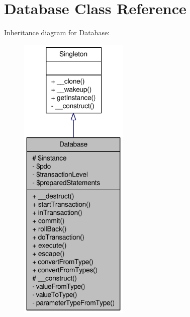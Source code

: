 \hypertarget{classDatabase}{
\section{Database Class Reference}
\label{classDatabase}
}


Inheritance diagram for Database:\nopagebreak
\begin{figure}[H]
\begin{center}
\leavevmode
\includegraphics[height=400pt]{classDatabase__inherit__graph}
\end{center}
\end{figure}


